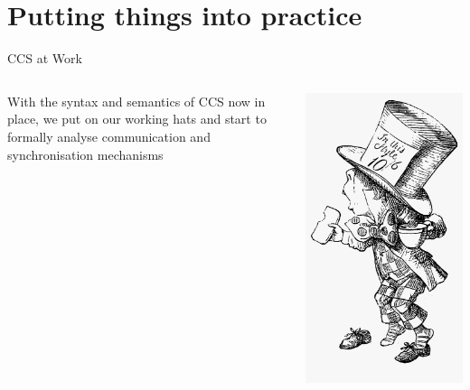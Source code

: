 \documentclass{beamer}
\begin{document}
\section{Putting things into practice}

\begin{frame}{CCS at Work}
  \begin{minipage}[0.3\textheight]{\textwidth}
  \begin{columns}[c]
  \begin{column}{0.62\textwidth}
    With the syntax and semantics of CCS now in place, we put on
    our working hats and start to \alert{formally} analyse
    communication and synchronisation mechanisms
  \end{column}
  \begin{column}{0.28\textwidth}
    \includegraphics[scale=0.1]{images/mad-hatter.png}
  \end{column}
  \end{columns}
  \end{minipage}
\end{frame}
\end{document}
